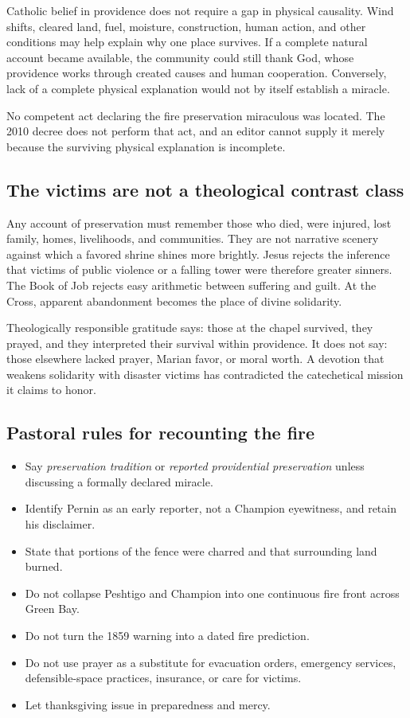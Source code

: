 Catholic belief in providence does not require a gap in physical causality. Wind shifts, cleared land, fuel, moisture, construction, human action, and other conditions may help explain why one place survives. If a complete natural account became available, the community could still thank God, whose providence works through created causes and human cooperation. Conversely, lack of a complete physical explanation would not by itself establish a miracle.

No competent act declaring the fire preservation miraculous was located. The 2010 decree does not perform that act, and an editor cannot supply it merely because the surviving physical explanation is incomplete.

\subsection{The victims are not a theological contrast class}

Any account of preservation must remember those who died, were injured, lost family, homes, livelihoods, and communities. They are not narrative scenery against which a favored shrine shines more brightly. Jesus rejects the inference that victims of public violence or a falling tower were therefore greater sinners. The Book of Job rejects easy arithmetic between suffering and guilt. At the Cross, apparent abandonment becomes the place of divine solidarity.

Theologically responsible gratitude says: those at the chapel survived, they prayed, and they interpreted their survival within providence. It does not say: those elsewhere lacked prayer, Marian favor, or moral worth. A devotion that weakens solidarity with disaster victims has contradicted the catechetical mission it claims to honor.

\subsection{Pastoral rules for recounting the fire}

\begin{itemize}
  \item Say \emph{preservation tradition} or \emph{reported providential preservation} unless discussing a formally declared miracle.
  \item Identify Pernin as an early reporter, not a Champion eyewitness, and retain his disclaimer.
  \item State that portions of the fence were charred and that surrounding land burned.
  \item Do not collapse Peshtigo and Champion into one continuous fire front across Green Bay.
  \item Do not turn the 1859 warning into a dated fire prediction.
  \item Do not use prayer as a substitute for evacuation orders, emergency services, defensible-space practices, insurance, or care for victims.
  \item Let thanksgiving issue in preparedness and mercy.
\end{itemize}

